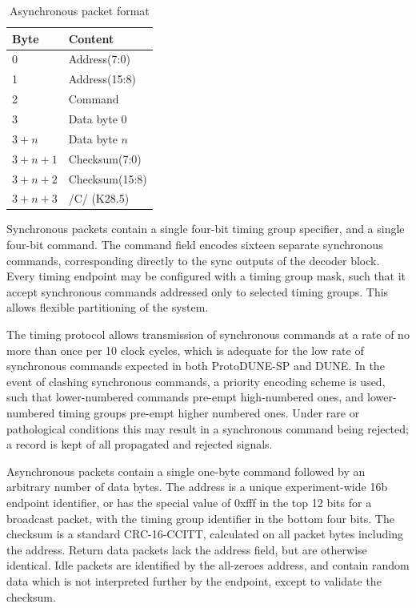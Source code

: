 \documentclass[a4paper,11pt]{article}
\begin{document}
\begin{table}[h!]
  \centering
  \begin{tabular}{@{}ll@{}} \toprule
    Byte & Content \\ \midrule
    0 & Address(7:0) \\
    1 & Address(15:8) \\
    2 & Command \\
    3 & Data byte 0 \\ 
    $3 + n$ & Data byte $n$ \\ 
    $3 + n + 1$ & Checksum(7:0) \\
    $3 + n + 2$ & Checksum(15:8) \\
    $3 + n + 3$ & /C/ (K28.5) \\ \bottomrule
  \end{tabular}
  \caption{Asynchronous packet format}
  \label{tab:async}
\end{table}

Synchronous packets contain a single four-bit timing group specifier, and a single four-bit command. The command field encodes sixteen separate synchronous commands, corresponding directly to the sync outputs of the decoder block. Every timing endpoint may be configured with a timing group mask, such that it accept synchronous commands addressed only to selected timing groups. This allows flexible partitioning of the system.

The timing protocol allows transmission of synchronous commands at a rate of no more than once per 10 clock cycles, which is adequate for the low rate of synchronous commands expected in both ProtoDUNE-SP and DUNE. In the event of clashing synchronous commands, a priority encoding scheme is used, such that lower-numbered commands pre-empt high-numbered ones, and lower-numbered timing groups pre-empt higher numbered ones. Under rare or pathological conditions this may result in a synchronous command being rejected; a record is kept of all propagated and rejected signals.

Asynchronous packets contain a single one-byte command followed by an arbitrary number of data bytes. The address is a unique experiment-wide 16b endpoint identifier, or has the special value of 0xfff in the top 12 bits for a broadcast packet, with the timing group identifier in the bottom four bits. The checksum is a standard CRC-16-CCITT, calculated on all packet bytes including the address. Return data packets lack the address field, but are otherwise identical. Idle packets are identified by the all-zeroes address, and contain random data which is not interpreted further by the endpoint, except to validate the checksum.
\end{document}
